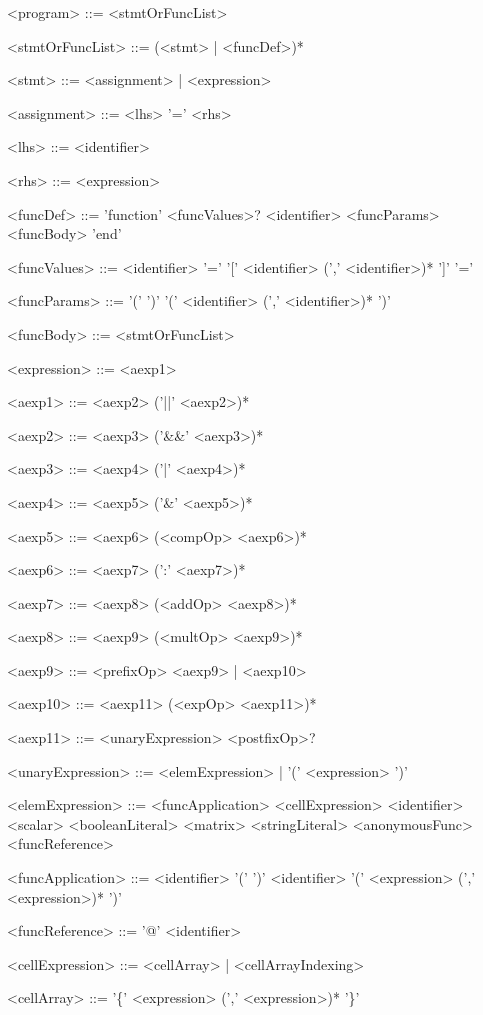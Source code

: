 \setlength{\grammarindent}{12em} %
\begin{grammar}
<program> ::= <stmtOrFuncList>

<stmtOrFuncList> ::= (<stmt> | <funcDef>)*

<stmt> ::= <assignment> | <expression>

<assignment> ::= <lhs> '=' <rhs>

<lhs> ::= <identifier>

<rhs> ::= <expression>

<funcDef> ::= 'function' <funcValues>? <identifier> <funcParams> <funcBody> 'end'

<funcValues> ::= <identifier> '='
\alt '[' <identifier> (',' <identifier>)* ']' '='

<funcParams> ::= '(' ')'
\alt '(' <identifier> (',' <identifier>)* ')'

<funcBody> ::= <stmtOrFuncList>

<expression> ::= <aexp1>

<aexp1> ::= <aexp2> ('||' <aexp2>)*

<aexp2> ::= <aexp3> ('\&\&' <aexp3>)*

<aexp3> ::= <aexp4> ('|' <aexp4>)*

<aexp4> ::= <aexp5> ('\&' <aexp5>)*

<aexp5> ::= <aexp6> (<compOp> <aexp6>)*

<aexp6> ::= <aexp7> (':' <aexp7>)*

<aexp7> ::= <aexp8> (<addOp> <aexp8>)*

<aexp8> ::= <aexp9> (<multOp> <aexp9>)*

<aexp9> ::= <prefixOp> <aexp9> | <aexp10>

<aexp10> ::= <aexp11> (<expOp> <aexp11>)*

<aexp11> ::= <unaryExpression> <postfixOp>?

<unaryExpression> ::= <elemExpression> | '(' <expression> ')'

<elemExpression> ::= <funcApplication> \alt <cellExpression> \alt <identifier> \alt <scalar> \alt <booleanLiteral> \alt <matrix> \alt <stringLiteral> \alt <anonymousFunc> \alt <funcReference>

<funcApplication> ::= <identifier> '(' ')'
\alt <identifier> '(' <expression> (',' <expression>)* ')'

<funcReference> ::= '@' <identifier>

<cellExpression> ::= <cellArray> | <cellArrayIndexing>

<cellArray> ::= '\{' <expression> (',' <expression>)* '\}'


\end{grammar}
